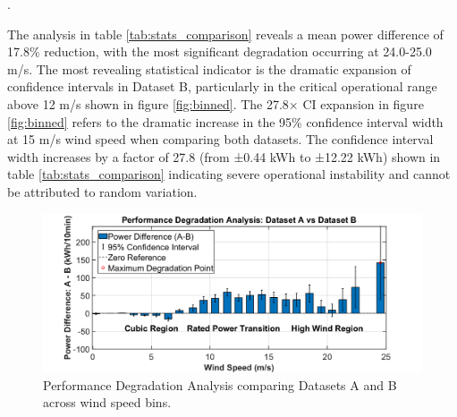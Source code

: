 .\documentclass[a4paper,11pt]{article}
\begin{document}
The analysis in table \ref{tab:stats_comparison} reveals a mean power difference of 17.8\% reduction, with the most significant degradation occurring at 24.0-25.0 m/s. The most revealing statistical indicator is the dramatic expansion of confidence intervals in Dataset B, particularly in the critical operational range above 12 m/s shown in figure \ref{fig:binned}. The 27.8× CI expansion in  figure \ref{fig:binned} refers to the dramatic increase in the 95\% confidence interval width at 15 m/s wind speed when comparing both datasets. The confidence interval width increases by a factor of 27.8 (from ±0.44 kWh to ±12.22 kWh) shown in  table \ref{tab:stats_comparison} indicating severe operational instability and cannot be attributed to random variation.
\begin{figure}[htbp]
    \centering
    \includegraphics[width=\textwidth]{Figure3_PerformanceDegradation.png}
    \caption{Performance Degradation Analysis comparing Datasets A and B across wind speed bins.}
    \label{fig:performance_degradation}
\end{figure}

\vspace{-20pt}
\end{document}
